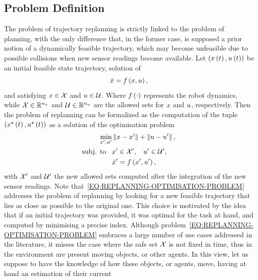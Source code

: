 \subsection{Problem Definition}%
\label{SEC:REPLANNING-PROBLEM-DEFINITION}
The problem of trajectory replanning is strictly linked to the problem of planning, with the only difference that, in the former case,
is supposed a prior notion of a dynamically feasible trajectory, which may become unfeasible due to possible collisions when new
sensor readings become available. Let $\left( x \left( t \right), u \left( t \right) \right)$ be an initial feasible state trajectory, solution of 
\begin{equation*}
    \dot{x} = f \left( x, u \right),
\end{equation*}
and satisfying $x \in \mathcal{X}$ and $u \in \mathcal{U}$. Where $f \left( \cdot \right)$ represents the robot dynamics, while $\mathcal{X} \in \mathbb{R}^{n_{x}}$
and $\mathcal{U} \in \mathbb{R}^{n_{u}}$ are the allowed sets for $x$ and $u$, respectively. Then the problem of replanning can be formalized as the
computation of the tuple $\left( x^{\star} \left( t \right), u^{\star} \left( t \right) \right)$ as a solution of the optimisation problem
\begin{equation}%
    \label{EQ:REPLANNING-OPTIMISATION-PROBLEM}
    \begin{split}
        \min_{\xx', \uu'} & \norm{\xx - \xx'} + \norm{\uu - \uu'}, \\
        \text{subj. to} \hspace{0.3cm} & \xx' \in \xset', \hspace{0.3cm} \uu' \in \uset', \\
        & \dot{\xx}' = \xfun \lp \xx', \uu' \rp,
    \end{split}
\end{equation}
with $\mathcal{X}'$ and $\mathcal{U}'$ the new allowed sets computed after the integration of the new sensor readings.
Note that~\eqref{EQ:REPLANNING-OPTIMISATION-PROBLEM} addresses the problem of replanning by looking for a new feasible trajectory
that lies as close as possible to the original one. This choice is motivated by the idea that if an initial trajectory was provided, it
was optimal for the task at hand, and computed by minimising a precise index.
Although problem~\eqref{EQ:REPLANNING-OPTIMISATION-PROBLEM} embraces a large number of use cases addressed in the literature, it misses the
case where the safe set $\mathcal{X}$ is not fixed in time, thus in the environment are present moving objects, or other agents.
In this view, let us suppose to have the knowledge of how these objects, or agents, move, having at hand an estimation of their current

